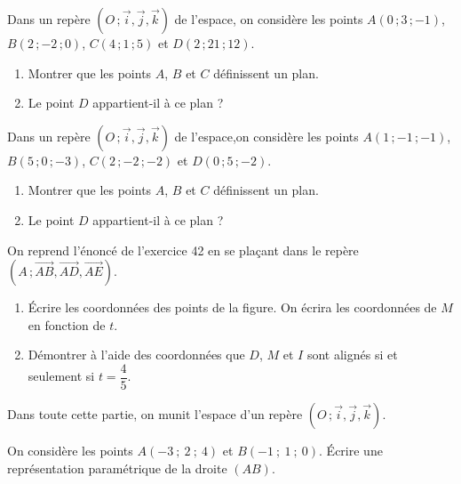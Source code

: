\documentclass{cornouaille}
\begin{document}
\begin{colonne*exercice}
\begin{exercice}
  Dans un repère $(O\,;\vec{i},\vec{j},\vec{k})$ de l'espace, on
  considère les points $A(0\,;3\,;-1)$, $B(2\,;-2\,;0)$, $C(4\,;1\,;5)$ et
  $D(2\,;21\,;12)$.
  \begin{enumerate}
  \item Montrer que les points $A$, $B$ et $C$ définissent un plan.
  \item Le point $D$ appartient-il à ce plan ?
  \end{enumerate}
\end{exercice}

\begin{exercice}
  Dans un repère $(O\,;\vec{i},\vec{j},\vec{k})$ de l'espace,on
  considère les points $A(1\,;-1\,;-1)$, $B(5\,;0\,;-3)$, $C(2\,;-2\,;-2)$ et
  $D(0\,;5\,;-2)$.
  \begin{enumerate}
  \item Montrer que les points $A$, $B$ et $C$ définissent un plan.
  \item Le point $D$ appartient-il à ce plan ?
  \end{enumerate}
\end{exercice}

\begin{exercice}
  On reprend l'énoncé de l'exercice 42 en se plaçant dans le repère
  $(A\,;\overrightarrow{AB},\overrightarrow{AD},\overrightarrow{AE})$.
  \begin{enumerate}
  \item Écrire les coordonnées des points de la figure. On écrira les
    coordonnées de $M$ en fonction de $t$.
  \item Démontrer à l'aide des coordonnées que $D$, $M$ et $I$ sont
    alignés si et seulement si $t=\dfrac{4}{5}$.
  \end{enumerate}
\end{exercice}


Dans toute cette partie, on munit l'espace d'un repère
$(O\,;\vec{i},\vec{j},\vec{k})$.

\begin{exercice}
  On considère les points $A(-3\ ;\ 2\ ;\ 4)$ et  $B(-1\ ;\ 1\ ;\ 0)$.
  Écrire une représentation paramétrique de la droite $(AB)$.
\end{exercice}


\end{colonne*exercice}
\end{document}
